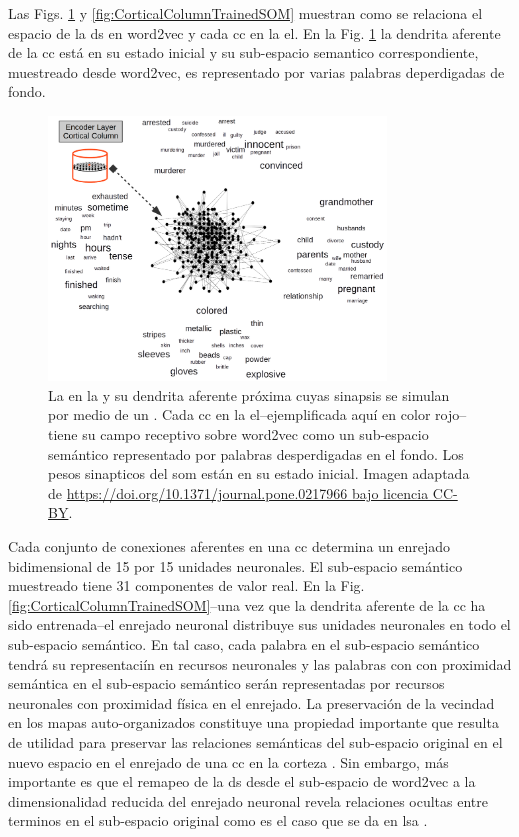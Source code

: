 {Las Figs. \ref{fig:CorticalColumnSOM} y \ref{fig:CorticalColumnTrainedSOM} muestran como se relaciona el espacio de la \gls{ds} en word2vec y cada \gls{cc} en la \gls{el}.
En la Fig. \ref{fig:CorticalColumnSOM} la dendrita aferente de la \gls{cc} está en su estado inicial y su sub-espacio semantico correspondiente, muestreado desde word2vec, es representado por varias palabras deperdigadas de fondo.
 
\begin{figure}[ht!]
    \centering
    \includegraphics[width=0.8\textwidth]{CorticalColumnSOM.png}
    \caption{La  en la  y su dendrita aferente próxima cuyas sinapsis se simulan  por medio de un . Cada \gls{cc} en la \gls{el}--ejemplificada aquí en color rojo--tiene su campo receptivo sobre word2vec como un sub-espacio semántico representado por palabras desperdigadas en el fondo. Los pesos sinapticos del \gls{som} están en su estado inicial. Imagen adaptada de \url{https://doi.org/10.1371/journal.pone.0217966 bajo licencia CC-BY}.}
    \label{fig:CorticalColumnSOM}
\end{figure}

Cada conjunto de conexiones aferentes en una \gls{cc} determina un enrejado bidimensional de 15 por 15 unidades neuronales.
El sub-espacio semántico muestreado tiene 31 componentes de valor real.
En la Fig. \ref{fig:CorticalColumnTrainedSOM}--una vez que la dendrita aferente de la \gls{cc} ha sido entrenada--el enrejado neuronal distribuye sus unidades neuronales en todo el sub-espacio semántico. En tal caso, cada palabra en el sub-espacio semántico tendrá su representaciín en recursos neuronales y las palabras con con proximidad semántica en el sub-espacio semántico serán representadas por recursos neuronales con proximidad física en el enrejado. La preservación de la vecindad en los mapas auto-organizados constituye una propiedad importante que resulta de utilidad para preservar las relaciones semánticas del sub-espacio original en el nuevo espacio en el enrejado de una \gls{cc} en la corteza \cite{557663}. Sin embargo, más importante es que el remapeo de la \gls{ds} desde el sub-espacio de word2vec a la dimensionalidad reducida del enrejado neuronal revela relaciones ocultas entre terminos en el sub-espacio original como es el caso que se da en \gls{lsa} \cite{key:article}.

}
